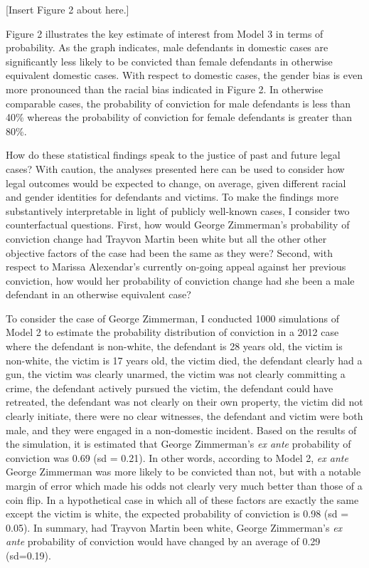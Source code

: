 \documentclass[12pt,article]{article}
\begin{document}
\begin{center}[Insert Figure 2 about here.]\end{center}

Figure 2 illustrates the key estimate of interest from Model 3 in terms
of probability. As the graph indicates, male defendants in domestic
cases are significantly less likely to be convicted than female
defendants in otherwise equivalent domestic cases. With respect to
domestic cases, the gender bias is even more pronounced than the racial
bias indicated in Figure 2. In otherwise comparable cases, the
probability of conviction for male defendants is less than 40\% whereas
the probability of conviction for female defendants is greater than
80\%.

How do these statistical findings speak to the justice of past and
future legal cases? With caution, the analyses presented here can be
used to consider how legal outcomes would be expected to change, on
average, given different racial and gender identities for defendants and
victims. To make the findings more substantively interpretable in light
of publicly well-known cases, I consider two counterfactual questions.
First, how would George Zimmerman's probability of conviction change had
Trayvon Martin been white but all the other other objective factors of
the case had been the same as they were? Second, with respect to Marissa
Alexendar's currently on-going appeal against her previous conviction,
how would her probability of conviction change had she been a male
defendant in an otherwise equivalent case?

To consider the case of George Zimmerman, I conducted 1000 simulations
of Model 2 to estimate the probability distribution of conviction in a
2012 case where the defendant is non-white, the defendant is 28 years
old, the victim is non-white, the victim is 17 years old, the victim
died, the defendant clearly had a gun, the victim was clearly unarmed,
the victim was not clearly committing a crime, the defendant actively
pursued the victim, the defendant could have retreated, the defendant
was not clearly on their own property, the victim did not clearly
initiate, there were no clear witnesses, the defendant and victim were
both male, and they were engaged in a non-domestic incident. Based on
the results of the simulation, it is estimated that George Zimmerman's
\emph{ex ante} probability of conviction was 0.69 (sd = 0.21). In other
words, according to Model 2, \emph{ex ante} George Zimmerman was more
likely to be convicted than not, but with a notable margin of error
which made his odds not clearly very much better than those of a coin
flip. In a hypothetical case in which all of these factors are exactly
the same except the victim is white, the expected probability of
conviction is 0.98 (sd = 0.05). In summary, had Trayvon Martin been
white, George Zimmerman's \emph{ex ante} probability of conviction would
have changed by an average of 0.29 (sd=0.19).
\end{document}
